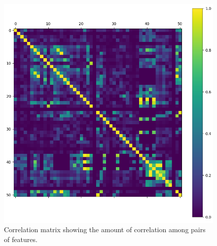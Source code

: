 \documentclass[11pt]{article}
\begin{document}
        \begin{figure}
          \centering
          \caption{Correlation matrix showing the amount of correlation among pairs of features.}
          \label{figure:correlation_matrix}
          \includegraphics[scale=0.6]{thesis_res/corr/heatmap_cropped.png}
        \end{figure}
\end{document}
